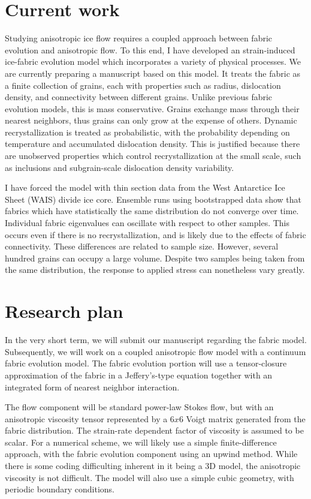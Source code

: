 \documentclass{article}
\begin{document}
\section{Current work}
Studying anisotropic ice flow requires a coupled approach between fabric evolution and anisotropic flow. To this end, I have developed an strain-induced ice-fabric evolution model which incorporates a variety of physical processes. We are currently preparing a manuscript based on this model. It treats the fabric as a finite collection of grains, each with properties such as radius, dislocation density, and connectivity between different grains. Unlike previous fabric evolution models, this is mass conservative. Grains exchange mass through their nearest neighbors, thus grains can only grow at the expense of others. Dynamic recrystallization is treated as probabilistic, with the probability depending on temperature and accumulated dislocation density. This is justified because there are unobserved properties which control recrystallization at the small scale, such as inclusions and subgrain-scale dislocation density variability.

I have forced the model with thin section data from the West Antarctice Ice Sheet (WAIS) divide ice core. Ensemble runs using bootstrapped data show that fabrics which have statistically the same distribution do not converge over time. Individual fabric eigenvalues can oscillate with respect to other samples. This occurs even if there is no recrystallization, and is likely due to the effects of fabric connectivity. These differences are related to sample size. However, several hundred grains can occupy a large volume. Despite two samples being taken from the same distribution, the response to applied stress can nonetheless vary greatly. 

\section{Research plan}
In the very short term, we will submit our manuscript regarding the fabric model. Subsequently, we will work on a coupled anisotropic flow model with a continuum fabric evolution model. The fabric evolution portion will use a tensor-closure approximation of the fabric in a Jeffery's-type equation \citep{jeffery1922} together with an integrated form of nearest neighbor interaction.

The flow component will be standard power-law Stokes flow, but with an anisotropic viscosity tensor represented by a $6x6$ Voigt matrix generated from the fabric distribution. The strain-rate dependent factor of viscosity is assumed to be scalar. For a numerical scheme, we will likely use a simple finite-difference approach, with the fabric evolution component using an upwind method. While there is some coding difficulting inherent in it being a 3D model, the anisotropic viscosity is not difficult. The model will also use a simple cubic geometry, with periodic boundary conditions.
\end{document}
